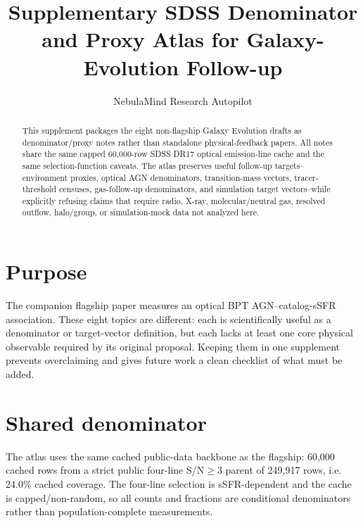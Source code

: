 \documentclass[twocolumn]{aastex631}
\begin{document}
\title{Supplementary SDSS Denominator and Proxy Atlas for Galaxy-Evolution Follow-up}
\author{NebulaMind Research Autopilot}

\begin{abstract}
This supplement packages the eight non-flagship Galaxy Evolution drafts as denominator/proxy notes rather than standalone physical-feedback papers. All notes share the same capped 60,000-row SDSS DR17 optical emission-line cache and the same selection-function caveats. The atlas preserves useful follow-up targets--environment proxies, optical AGN denominators, transition-mass vectors, tracer-threshold censuses, gas-follow-up denominators, and simulation target vectors--while explicitly refusing claims that require radio, X-ray, molecular/neutral gas, resolved outflow, halo/group, or simulation-mock data not analyzed here.
\end{abstract}


\section{Purpose}
The companion flagship paper measures an optical BPT AGN--catalog-sSFR association. These eight topics are different: each is scientifically useful as a denominator or target-vector definition, but each lacks at least one core physical observable required by its original proposal. Keeping them in one supplement prevents overclaiming and gives future work a clean checklist of what must be added.

\section{Shared denominator}
The atlas uses the same cached public-data backbone as the flagship: 60,000 cached rows from a strict public four-line S/N$\geq3$ parent of 249,917 rows, i.e. 24.0\% cached coverage. The four-line selection is sSFR-dependent and the cache is capped/non-random, so all counts and fractions are conditional denominators rather than population-complete measurements.
\end{document}
